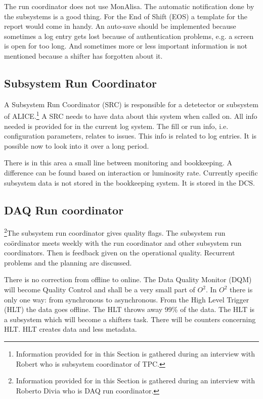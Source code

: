 The run coordinator does not use MonAlisa. The automatic notification done by the subsystems is a good thing. For the End of Shift (EOS) a template for the report would come in handy. An auto-save should be implemented because sometimes a log entry gets lost because of authentication problems, e.g. a screen is open for too long. And sometimes more or less important information is not mentioned because a shifter has forgotten about it.

\subsection{Subsystem Run Coordinator}
A Subsystem Run Coordinator (SRC) is responsible for a detetector or subsystem of ALICE.\footnote{Information provided for in this Section is gathered during an interview with Robert who is subsystem coordinator of TPC.} A SRC needs to have data about this system when called on. All info needed is provided for in the current log system. The fill or run info, i.e. configuration parameters, relates to issues. This info is related to log entries. It is possible now to look into it over a long period.

There is in this area a small line between monitoring and bookkeeping. A difference can be found based on interaction or luminosity rate. Currently specific subsystem data is not stored in the bookkeeping system. It is stored in the DCS.

\subsection{DAQ Run coordinator}
\footnote{Information provided for in this Section is gathered during an interview with Roberto Divia who is DAQ run coordinator.}The subsystem run coordinator gives quality flags. The subsystem run co\"ordinator meets weekly with the run coordinator and other subsystem run coordinators. Then is feedback given on the operational quality. Recurrent problems and the planning are discussed.

There is no correction from offline to online. The Data Quality Monitor (DQM) will become Quality Control and shall be a very small part of $O^2$. In $O^2$ there is only one way: from synchronous to asynchronous. From the High Level Trigger (HLT) the data goes offline. The HLT throws away 99\% of the data. The HLT is a subsystem which will become a shifters task. There will be counters concerning HLT. HLT creates data and less metadata. 

